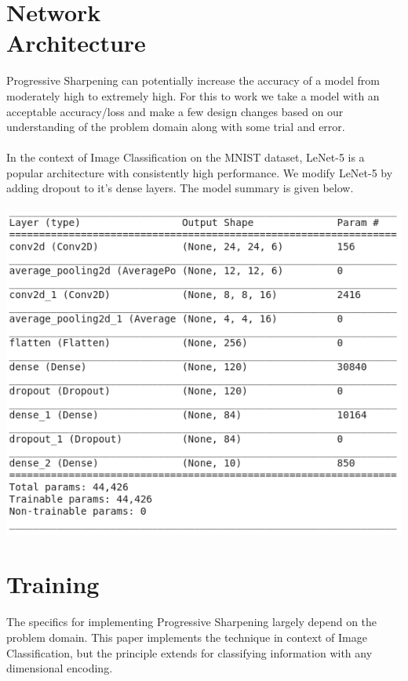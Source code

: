 \documentclass[12pt]{article}
\begin{document}
\begin{multicols}{2}
		\section{Network \\Architecture}
		Progressive Sharpening can potentially increase the accuracy of a model from moderately high to extremely high. For this to work we take a model with an acceptable accuracy/loss and make a few design changes based on our understanding of the problem domain along with some trial and error.
		\\\\
		In the context of Image Classification on the MNIST dataset, LeNet-5 is a popular architecture with consistently high performance. We modify LeNet-5 by adding dropout to it's dense layers. The model summary is given below.
		\\\\
		\includegraphics[width=\linewidth]{assets/summary.png}

		\section{Training}
		The specifics for implementing Progressive Sharpening largely depend on the problem domain. This paper implements the technique in context of Image Classification, but the principle extends for classifying information with any dimensional encoding.

\end{multicols}
\end{document}

